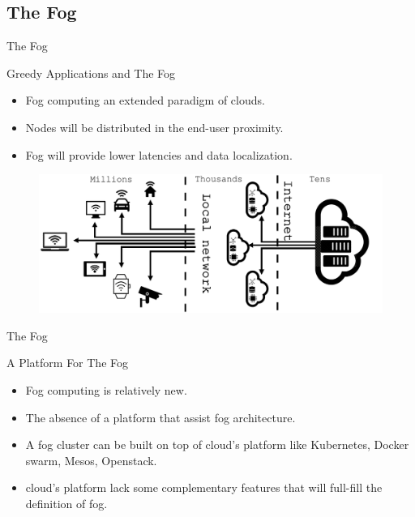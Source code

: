 \subsection{The Fog}
\begin{withoutheadline}
\begin{frame}{The Fog}

\begin{block}{Greedy Applications and The Fog}
    \begin{itemize}
    \item Fog computing an extended paradigm of clouds.
    \item Nodes will be distributed in the  end-user proximity.
    \item Fog will provide lower latencies and data localization.
    \end{itemize}
\end{block} 

\begin{figure}[p]

\includegraphics[width=0.9\linewidth]{figures/fog.png}
  
\end{figure}
\end{frame}
\end{withoutheadline}



\begin{withoutheadline}
\begin{frame}{The Fog}

\begin{block}{A Platform For The Fog}
    \begin{itemize}
    \item Fog computing is relatively new.
    \item<2-> The absence of a platform that assist fog architecture.
    \item<3-> A fog cluster can be built on top of cloud's platform like Kubernetes, Docker swarm, Mesos, Openstack.
    \item<4-> cloud's platform lack some complementary features that will full-fill the definition of fog. 
    \end{itemize}
\end{block} 
\end{frame}
\end{withoutheadline}



